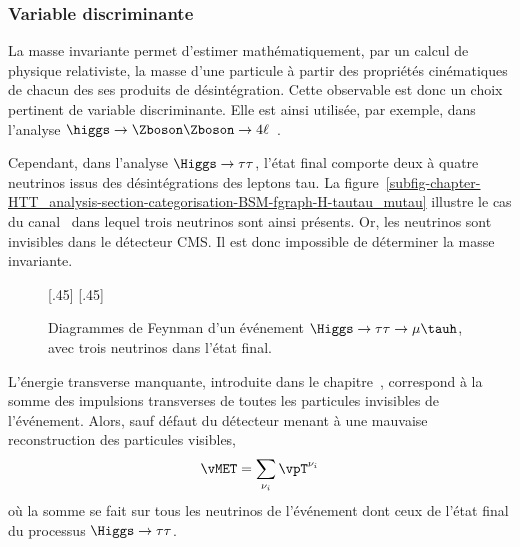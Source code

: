 \subsubsection{Variable discriminante}
La masse invariante permet d'estimer mathématiquement, par un calcul de physique relativiste, la masse d'une particule à partir des propriétés cinématiques de chacun des ses produits de désintégration.
Cette observable est donc un choix pertinent de variable discriminante.
Elle est ainsi utilisée, par exemple, dans l'analyse $\higgs\to\Zboson\Zboson\to4\ell$~\cite{CMS-PAS-HIG-13-002}.
\par
Cependant, dans l'analyse $\Higgs\to\tau\tau$, l'état final comporte deux à quatre neutrinos issus des désintégrations des leptons tau.
La figure~\ref{subfig-chapter-HTT_analysis-section-categorisation-BSM-fgraph-H-tautau_mutau} illustre le cas du canal \mu\tauh\ dans lequel trois neutrinos sont ainsi présents.
Or, les neutrinos sont invisibles dans le détecteur CMS.
Il est donc impossible de déterminer la masse invariante.
\begin{figure}[h]
\centering
\vspace{\baselineskip}

[.45\textwidth]
{}
\hfill
{}[.45\textwidth]
{}

\caption[Diagrammes de Feynman d'un événement $\Higgs\to\tau\tau\to\mu\tauh$.]{Diagrammes de Feynman d'un événement $\Higgs\to\tau\tau\to\mu\tauh$, avec trois neutrinos dans l'état final.}
\label{fig-chapter-HTT_analysis-section-categorisation-BSM-fgraph-H-tautau_mutau-for_mTtot}
\end{figure}
\par
L'énergie transverse manquante, introduite dans le chapitre~, correspond à la somme des impulsions transverses de toutes les particules invisibles de l'événement.
Alors, sauf défaut du détecteur menant à une mauvaise reconstruction des particules visibles,
\begin{equation}
\vMET = \sum_{\nu_i} \vpT^{\nu_i}
\end{equation}
où la somme se fait sur tous les neutrinos de l'événement dont ceux de l'état final du processus $\Higgs\to\tau\tau$.
